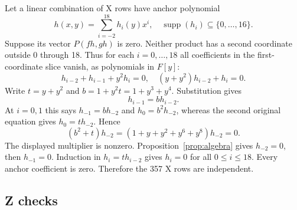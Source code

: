 \documentclass{article}
\DeclareMathOperator{\supp}{supp}
\begin{document}
Let a linear combination of X rows have anchor polynomial
\begin{equation}
  h(x,y) = \sum_{i=-2}^{18} h_i(y) x^i, \quad
  \supp(h_i) \subseteq \{0, \dots, 16\}.
\end{equation}
Suppose its vector \(P(fh, gh)\) is zero. Neither product has a second
coordinate outside 0 through 18. Thus for each \(i = 0, \dots, 18\) all
coefficients in the first-coordinate slice vanish, as polynomials in \(F[y]\):
\begin{equation}
  h_{i-2} + h_{i-1} + y^2 h_i = 0, \quad (y + y^2) h_{i-2} + h_i = 0.
\end{equation}
Write \(t = y + y^2\) and \(b = 1 + y^2 t = 1 + y^3 + y^4\). Substitution gives
\begin{equation}
  h_{i-1} = b h_{i-2}.
\end{equation}
At \(i = 0, 1\) this says \(h_{-1} = b h_{-2}\) and \(h_0 = b^2 h_{-2}\),
whereas the second original equation gives \(h_0 = t h_{-2}\). Hence
\begin{equation}
  (b^2 + t) h_{-2} = (1 + y + y^2 + y^6 + y^8) h_{-2} = 0.
\end{equation}
The displayed multiplier is nonzero. Proposition~\ref{prop:algebra} gives
\(h_{-2} = 0\), then \(h_{-1} = 0\). Induction in \(h_i = t h_{i-2}\) gives
\(h_i = 0\) for all \(0 \le i \le 18\). Every anchor coefficient is zero.
Therefore the 357 X rows are independent.

\subsection{Z checks}\label{sec:z-checks}
\end{document}
